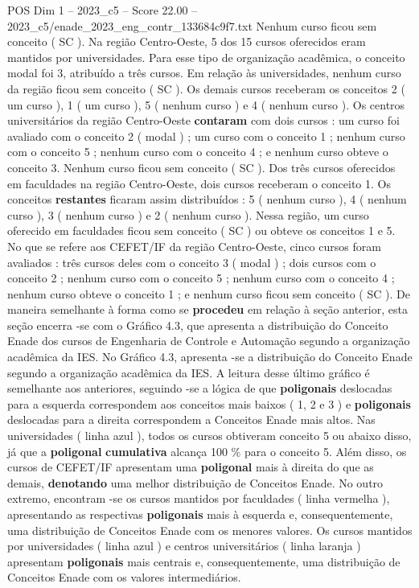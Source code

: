 \begin{textsample}{POS Dim 1 – 2023\_c5 – Score 22.00 – 2023\_c5/enade\_2023\_eng\_contr\_133684c9f7.txt}
Nenhum curso ficou sem conceito ( SC ).
Na região Centro-Oeste, 5 dos 15 cursos oferecidos eram mantidos por universidades.
Para esse tipo de organização acadêmica, o conceito modal foi 3, atribuído a três cursos.
Em relação às universidades, nenhum curso da região ficou sem conceito ( SC ).
Os demais cursos receberam os conceitos 2 ( um curso ), 1 ( um curso ), 5 ( nenhum curso ) e 4 ( nenhum curso ).
Os centros universitários da região Centro-Oeste \textbf{contaram} com dois cursos : um curso foi avaliado com o conceito 2 ( modal ) ; um curso com o conceito 1 ; nenhum curso com o conceito 5 ; nenhum curso com o conceito 4 ; e nenhum curso obteve o conceito 3.
Nenhum curso ficou sem conceito ( SC ).
Dos três cursos oferecidos em faculdades na região Centro-Oeste, dois cursos receberam o conceito 1.
Os conceitos \textbf{restantes} ficaram assim distribuídos : 5 ( nenhum curso ), 4 ( nenhum curso ), 3 ( nenhum curso ) e 2 ( nenhum curso ).
Nessa região, um curso oferecido em faculdades ficou sem conceito ( SC ) ou obteve os conceitos 1 e 5.
No que se refere aos CEFET/IF da região Centro-Oeste, cinco cursos foram avaliados : três cursos deles com o conceito 3 ( modal ) ; dois cursos com o conceito 2 ; nenhum curso com o conceito 5 ; nenhum curso com o conceito 4 ; nenhum curso obteve o conceito 1 ; e nenhum curso ficou sem conceito ( SC ).
De maneira semelhante à forma como se \textbf{procedeu} em relação à seção anterior, esta seção encerra -se com o Gráfico 4.3, que apresenta a distribuição do Conceito Enade dos cursos de Engenharia de Controle e Automação segundo a organização acadêmica da IES.
No Gráfico 4.3, apresenta -se a distribuição do Conceito Enade segundo a organização acadêmica da IES.
A leitura desse último gráfico é semelhante aos anteriores, seguindo -se a lógica de que \textbf{poligonais} deslocadas para a esquerda correspondem aos conceitos mais baixos ( 1, 2 e 3 ) e \textbf{poligonais} deslocadas para a direita correspondem a Conceitos Enade mais altos.
Nas universidades ( linha azul ), todos os cursos obtiveram conceito 5 ou abaixo disso, já que a \textbf{poligonal} \textbf{cumulativa} alcança 100 \% para o conceito 5.
Além disso, os cursos de CEFET/IF apresentam uma \textbf{poligonal} mais à direita do que as demais, \textbf{denotando} uma melhor distribuição de Conceitos Enade.
No outro extremo, encontram -se os cursos mantidos por faculdades ( linha vermelha ), apresentando as respectivas \textbf{poligonais} mais à esquerda e, consequentemente, uma distribuição de Conceitos Enade com os menores valores.
Os cursos mantidos por universidades ( linha azul ) e centros universitários ( linha laranja ) apresentam \textbf{poligonais} mais centrais e, consequentemente, uma distribuição de Conceitos Enade com os valores intermediários.

\end{textsample}
